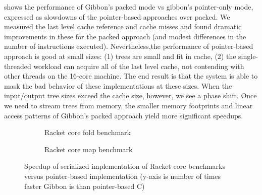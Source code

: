  shows the performance of Gibbon's packed mode vs gibbon's
pointer-only mode, expressed as slowdowns of the pointer-based approaches over
packed. We measured the last level cache reference and cache misses and found
dramatic improvements in these for the packed approach (and modest differences
in the number of instructions executed).
%
Nevertheless,the performance of pointer-based
approach is good at small sizes: (1) trees are small and fit in cache, (2) the
single-threaded workload can acquire all of the last level cache, not contending
with other threads on the 16-core machine. The end result is that the system is
able to mask the bad behavior of these implementations at these sizes.
%
When the input/output tree sizes exceed the cache size, however, we see a phase
shift. Once we need to stream trees from memory, the smaller memory footprints
and linear access patterns of Gibbon's packed approach yield more significant
speedups.

\begin{figure}
  \begin{subfigure}[t]{\linewidth}
    \centering
    
    \caption{Racket core fold benchmark}
  \end{subfigure}
  \begin{subfigure}[t]{\linewidth}
    \centering
    
    \caption{Racket core map benchmark}
  \end{subfigure}
  \caption{Speedup of serialized implementation of Racket core benchmarks versus
    pointer-based implementation (y-axis is number of times faster Gibbon is than
    pointer-based C)}\label{fig:racket-core-slowdown}
\end{figure}


